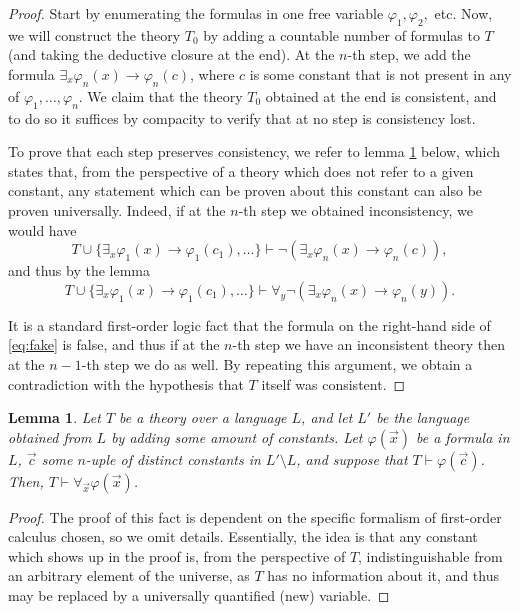 \documentclass{article}
\newtheorem{lemma}{Lemma}
\theoremstyle{nonumberplain}
\newtheorem{proof}{Proof}
\begin{document}
\begin{proof}
Start by enumerating the formulas in one free variable $\varphi_1, \varphi_2, $ etc. Now, we will construct the theory $T_0$ by adding a countable number of formulas to $T$ (and taking the deductive closure at the end). At the $n$-th step, we add the formula $\exists_x \varphi_n(x) \rightarrow \varphi_n(c)$, where $c$ is some constant that is not present in any of $\varphi_1, \dots, \varphi_n$. We claim that the theory $T_0$ obtained at the end is consistent, and to do so it suffices by compacity to verify that at no step is consistency lost.

To prove that each step preserves consistency, we refer to lemma \ref{lemma:newvar} below, which states that, from the perspective of a theory which does not refer to a given constant, any statement which can be proven about this constant can also be proven universally. Indeed, if at the $n$-th step we obtained inconsistency, we would have
\begin{equation}
T \cup \{\exists_x \varphi_1(x) \rightarrow \varphi_1(c_1), \dots\} \vdash \neg(\exists_x \varphi_n(x) \rightarrow \varphi_n(c)),
\end{equation}
and thus by the lemma
\begin{equation}\label{eq:fake}
T \cup \{\exists_x \varphi_1(x) \rightarrow \varphi_1(c_1), \dots\} \vdash \forall_y \neg(\exists_x \varphi_n(x) \rightarrow \varphi_n(y)).
\end{equation}

It is a standard first-order logic fact that the formula on the right-hand side of \eqref{eq:fake} is false, and thus if at the $n$-th step we have an inconsistent theory then at the $n-1$-th step we do as well. By repeating this argument, we obtain a contradiction with the hypothesis that $T$ itself was consistent.
\end{proof}

\begin{lemma}\label{lemma:newvar}
Let $T$ be a theory over a language $L$, and let $L'$ be the language obtained from $L$ by adding some amount of constants. Let $\varphi(\vec x)$ be a formula in $L$, $\vec c$ some $n$-uple of \emph{distinct} constants in $L' \setminus L$, and suppose that $T \vdash \varphi(\vec c)$. Then, $T \vdash \forall_{\vec x} \varphi(\vec x)$.
\end{lemma}

\begin{proof}
The proof of this fact is dependent on the specific formalism of first-order calculus chosen, so we omit details. Essentially, the idea is that any constant which shows up in the proof is, from the perspective of $T$, indistinguishable from an arbitrary element of the universe, as $T$ has no information about it, and thus may be replaced by a universally quantified (new) variable.
\end{proof}
\end{document}
